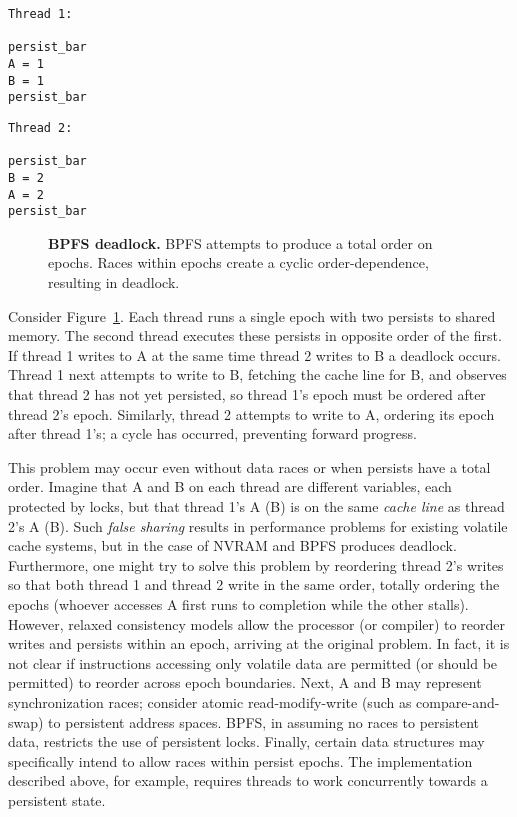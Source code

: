 {
\singlespacing
\newsavebox{\ThreadOne}
\begin{lrbox}{\ThreadOne}
  \begin{lstlisting}
Thread 1:

persist_bar
A = 1
B = 1
persist_bar
  \end{lstlisting}
\end{lrbox}

\newsavebox{\ThreadTwo}
\begin{lrbox}{\ThreadTwo}
  \begin{lstlisting}
Thread 2:

persist_bar
B = 2
A = 2
persist_bar
  \end{lstlisting}
\end{lrbox}

\begin{figure}[]
\centering
\subfigure{ \usebox{\ThreadOne} }
\hspace{1 in}
\subfigure{ \usebox{\ThreadTwo} }
\caption{\textbf{BPFS deadlock.} BPFS attempts to produce a total order on epochs.  Races within epochs create a cyclic order-dependence, resulting in deadlock.}
\label{fig:BPFS_deadlock}
\end{figure}
}

Consider Figure~\ref{fig:BPFS_deadlock}.
Each thread runs a single epoch with two persists to shared memory.
The second thread executes these persists in opposite order of the first.
If thread 1 writes to A at the same time thread 2 writes to B a deadlock occurs.
Thread 1 next attempts to write to B, fetching the cache line for B, and observes that thread 2 has not yet persisted, so thread 1's epoch must be ordered after thread 2's epoch.
Similarly, thread 2 attempts to write to A, ordering its epoch after thread 1's; a cycle has occurred, preventing forward progress.

This problem may occur even without data races or when persists have a total order.
Imagine that A and B on each thread are different variables, each protected by locks, but that thread 1's A (B) is on the same \emph{cache line} as thread 2's A (B).
Such \emph{false sharing} results in performance problems for existing volatile cache systems, but in the case of NVRAM and BPFS produces deadlock.
Furthermore, one might try to solve this problem by reordering thread 2's writes so that both thread 1 and thread 2 write in the same order, totally ordering the epochs (whoever accesses A first runs to completion while the other stalls).
However, relaxed consistency models allow the processor (or compiler) to reorder writes and persists within an epoch, arriving at the original problem.
In fact, it is not clear if instructions accessing only volatile data are permitted (or should be permitted) to reorder across epoch boundaries.
Next, A and B may represent synchronization races; consider atomic read-modify-write (such as compare-and-swap) to persistent address spaces.
BPFS, in assuming no races to persistent data, restricts the use of persistent locks.
Finally, certain data structures may specifically intend to allow races within persist epochs.
The \GroupCommit implementation described above, for example, requires threads to work concurrently towards a persistent state.

